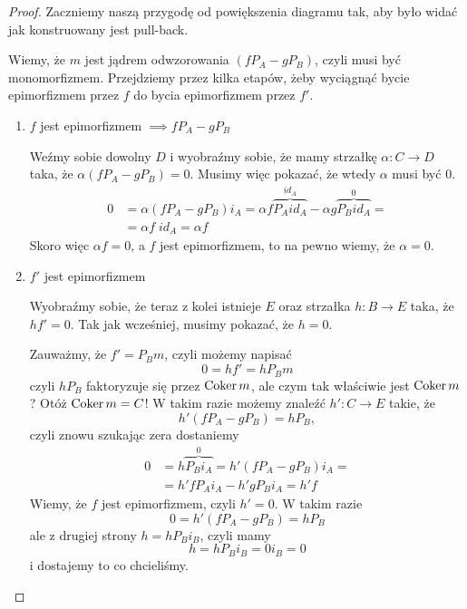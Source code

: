 \begin{proof}
  Zaczniemy naszą przygodę od powiększenia diagramu tak, aby było widać jak konstruowany jest pull-back.

  \begin{center}\end{center}
  Wiemy, że $m$ jest jądrem odwzorowania $(fP_A-gP_B)$, czyli musi być monomorfizmem. Przejdziemy przez kilka etapów, żeby wyciągnąć bycie epimorfizmem przez $f$ do bycia epimorfizmem przez $f'$.
  \begin{enumerate}
    \item $f$ jest epimorfizmem $\implies fP_A-gP_B$

      Weźmy sobie dowolny $D$ i wyobraźmy sobie, że mamy strzałkę $\alpha:C\to D$ taka, że $\alpha(fP_A-gP_B)=0$. Musimy więc pokazać, że wtedy $\alpha$ musi być $0$.
      \begin{align*}
        0 &= \alpha(fP_A-gP_B)i_A=\alpha f\overbrace{P_Aid_A}^{id_A}-\alpha g\overbrace{P_Bid_A}^0=\\ 
          &=\alpha f\;id_A=\alpha f
      \end{align*}
      Skoro więc $\alpha f=0$, a $f$ jest epimorfizmem, to na pewno wiemy, że $\alpha=0$.
    \item $f'$ jest epimorfizmem

      Wyobraźmy sobie, że teraz z kolei istnieje $E$ oraz strzałka $h:B\to E$ taka, że $hf'=0$. Tak jak wcześniej, musimy pokazać, że $h=0$.

      Zauważmy, że $f'=P_Bm$, czyli możemy napisać
      $$0=hf'=hP_Bm$$
      czyli $hP_B$ faktoryzuje się przez $\operatorname{Coker} m$, ale czym tak właściwie jest $\operatorname{Coker} m$? Otóż $\operatorname{Coker} m=C$! W takim razie możemy znaleźć $h':C\to E$ takie, że
      $$h'(fP_A-gP_B)=hP_B,$$
      czyli znowu szukając zera dostaniemy
      \begin{align*}
        0&=h\overbrace{P_Bi_A}^0=h'(fP_A-gP_B)i_A=\\ 
         &=h'fP_Ai_A-h'gP_Bi_A=h'f
      \end{align*}
      Wiemy, że $f$ jest epimorfizmem, czyli $h'=0$. W takim razie
      $$0=h'(fP_A-gP_B)=hP_B$$
      ale z drugiej strony $h=hP_Bi_B$, czyli mamy
      $$h=hP_Bi_B=0i_B=0$$
      i dostajemy to co chcieliśmy.
  \end{enumerate}
\end{proof}


